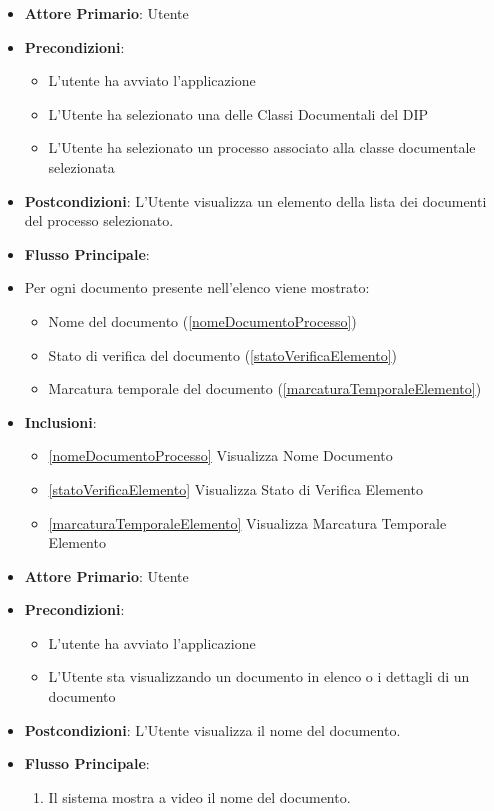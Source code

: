 \begin{itemize}
    \item \textbf{Attore Primario}: Utente
    \item \textbf{Precondizioni}: 
    \begin{itemize}
        \item L'utente ha avviato l'applicazione
        \item L'Utente ha selezionato una delle Classi Documentali del DIP
        \item L'Utente ha selezionato un processo associato alla classe documentale selezionata
    \end{itemize}
    \item \textbf{Postcondizioni}: L'Utente visualizza un elemento della lista dei documenti del processo selezionato.
    \item \textbf{Flusso Principale}:
    \item Per ogni documento presente nell'elenco viene mostrato:
        \begin{itemize}
            \item Nome del documento (\ref{nomeDocumentoProcesso})
            \item Stato di verifica del documento (\ref{statoVerificaElemento})
            \item Marcatura temporale del documento (\ref{marcaturaTemporaleElemento})
        \end{itemize}
    \item \textbf{Inclusioni}:
    \begin{itemize}
        \item \ref{nomeDocumentoProcesso} Visualizza Nome Documento
        \item \ref{statoVerificaElemento} Visualizza Stato di Verifica Elemento
        \item \ref{marcaturaTemporaleElemento} Visualizza Marcatura Temporale Elemento
    \end{itemize}
\end{itemize}


\begin{itemize}
    \item \textbf{Attore Primario}: Utente
    \item \textbf{Precondizioni}: \begin{itemize}
        \item L'utente ha avviato l'applicazione
        \item L'Utente sta visualizzando un documento in elenco o i dettagli di un documento
    \end{itemize}
    \item \textbf{Postcondizioni}: L'Utente visualizza il nome del documento.
    \item \textbf{Flusso Principale}:
    \begin{enumerate}
        \item Il sistema mostra a video il nome del documento.
    \end{enumerate}
\end{itemize}


